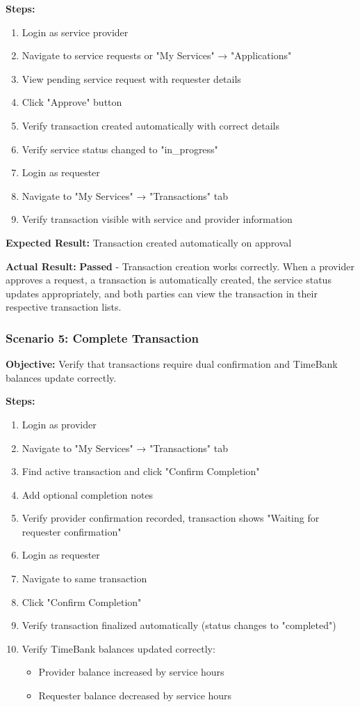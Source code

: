 \documentclass[12pt,a4paper]{report}
\begin{document}
\textbf{Steps:}
\begin{enumerate}
    \item Login as service provider
    \item Navigate to service requests or "My Services" → "Applications"
    \item View pending service request with requester details
    \item Click "Approve" button
    \item Verify transaction created automatically with correct details
    \item Verify service status changed to "in\_progress"
    \item Login as requester
    \item Navigate to "My Services" → "Transactions" tab
    \item Verify transaction visible with service and provider information
\end{enumerate}

\textbf{Expected Result:} Transaction created automatically on approval

\textbf{Actual Result:} \textbf{Passed} - Transaction creation works correctly. When a provider approves a request, a transaction is automatically created, the service status updates appropriately, and both parties can view the transaction in their respective transaction lists.

\subsubsection{Scenario 5: Complete Transaction}

\textbf{Objective:} Verify that transactions require dual confirmation and TimeBank balances update correctly.

\textbf{Steps:}
\begin{enumerate}
    \item Login as provider
    \item Navigate to "My Services" → "Transactions" tab
    \item Find active transaction and click "Confirm Completion"
    \item Add optional completion notes
    \item Verify provider confirmation recorded, transaction shows "Waiting for requester confirmation"
    \item Login as requester
    \item Navigate to same transaction
    \item Click "Confirm Completion"
    \item Verify transaction finalized automatically (status changes to "completed")
    \item Verify TimeBank balances updated correctly:
          \begin{itemize}
              \item Provider balance increased by service hours
              \item Requester balance decreased by service hours
          \end{itemize}
\end{enumerate}
\end{document}
